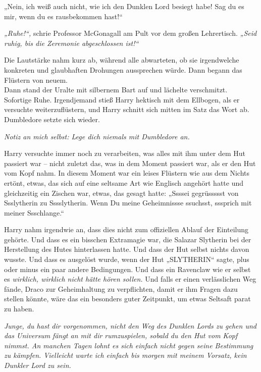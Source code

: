 {„Nein, ich weiß auch nicht, wie ich den Dunklen Lord besiegt habe! Sag du es mir, wenn du es rausbekommen hast!“

\emph{„Ruhe!“,} schrie Professor McGonagall am Pult vor dem großen Lehrertisch. \emph{„Seid ruhig, bis die Zeremonie abgeschlossen ist!“}

Die Lautstärke nahm kurz ab, während alle abwarteten, ob sie irgendwelche konkreten und glaubhaften Drohungen aussprechen würde. Dann begann das Flüstern von neuem.\\ Dann stand der Uralte mit silbernem Bart auf und lächelte verschmitzt.\\ Sofortige Ruhe. Irgendjemand stieß Harry hektisch mit dem Ellbogen, als er versuchte weiterzuflüstern, und Harry schnitt sich mitten im Satz das Wort ab.\\ Dumbledore setzte sich wieder.

\emph{Notiz an mich selbst: Lege dich niemals mit Dumbledore an.}

Harry versuchte immer noch zu verarbeiten, was alles mit ihm unter dem Hut passiert war -- nicht zuletzt das, was in dem Moment passiert war, als er den Hut vom Kopf nahm. In diesem Moment war ein leises Flüstern wie aus dem Nichts ertönt, etwas, das sich auf eine seltsame Art wie Englisch angehört hatte und gleichzeitig ein Zischen war, etwas, das gesagt hatte: „Ssssei gegrüssssst von Ssslytherin zu Sssslytherin. Wenn Du meine Geheimnissse ssuchsst, sssprich mit meiner Ssschlange.“

Harry nahm irgendwie an, dass dies nicht zum offiziellen Ablauf der Einteilung gehörte. Und dass es ein bisschen Extramagie war, die Salazar Slytherin bei der Herstellung des Hutes hinterlassen hatte. Und dass der Hut selbst nichts davon wusste. Und dass es ausgelöst wurde, wenn der Hut „SLYTHERIN“ sagte, plus oder minus ein paar andere Bedingungen. Und dass ein Ravenclaw wie er selbst es \emph{wirklich, wirklich nicht hätte hören sollen.} Und falls er einen verlässlichen Weg fände, Draco zur Geheimhaltung zu verpflichten, damit er ihm Fragen dazu stellen könnte, wäre das ein besonders guter Zeitpunkt, um etwas Seltsaft parat zu haben.

\emph{Junge, du hast dir vorgenommen, nicht den Weg des Dunklen Lords zu gehen und das Universum fängt an mit dir rumzuspielen, sobald du den Hut vom Kopf nimmst. An manchen Tagen lohnt es sich einfach nicht gegen seine Bestimmung zu kämpfen. Vielleicht warte ich einfach bis morgen mit meinem Vorsatz, kein Dunkler Lord zu sein.}

}
